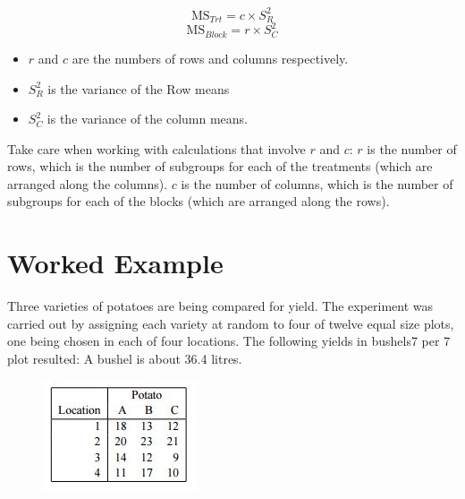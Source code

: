 \documentclass[]{article}
\begin{document}

\[ \textrm{MS}_{Trt} = c \times S^2_{R}\]
\[ \textrm{MS}_{Block} = r \times S^2_{C}\]

\begin{itemize}
	\item $r$ and $c$ are the numbers of rows and columns respectively.
	\item $S^2_{R}$ is the variance of the Row means 
	\item $S^2_{C}$ is the variance of the column means.
\end{itemize}

Take care when working with calculations that involve $r$ and $c$: 
$r$ is the number of rows, which is the number of subgroups for each of the treatments (which are arranged along the columns).
$c$ is the number of columns, which is the number of subgroups for each of the blocks (which are arranged along the rows).

\newpage
\section{Worked Example}

Three varieties of potatoes are being compared for yield. The experiment
was carried out by assigning each variety at random to four of twelve equal size
plots, one being chosen in each of four locations. The following yields in bushels7 per 7
plot resulted:
A bushel is about 36.4 litres.

\begin{figure}[h!]
\centering
\includegraphics[width=0.4\linewidth]{twowayanova-potato}
\end{figure}
\end{document}
